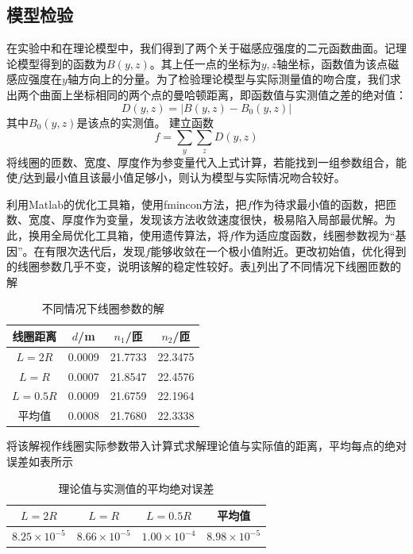 \documentclass{ctexart}
\begin{document}
\begin{multicols}{2}
\subsection{模型检验}
在实验中和在理论模型中，我们得到了两个关于磁感应强度的二元函数曲面。记理论模型得到的函数为$B(y,z)$。其上任一点的坐标为$y,z$轴坐标，函数值为该点磁感应强度在$y$轴方向上的分量。为了检验理论模型与实际测量值的吻合度，我们求出两个曲面上坐标相同的两个点的曼哈顿距离，即函数值与实测值之差的绝对值：
\begin{equation}
    D(y,z)=|B(y,z)-B_0(y,z)|
\end{equation}
其中$B_0(y,z)$是该点的实测值。
建立函数
\begin{equation}
    f=\sum_{y} \sum_{z} D(y,z)
\end{equation}
将线圈的匝数、宽度、厚度作为参变量代入上式计算，若能找到一组参数组合，能使$f$达到最小值且该最小值足够小，则认为模型与实际情况吻合较好。

利用Matlab的优化工具箱，使用fmincon方法，把$f$作为待求最小值的函数，把匝数、宽度、厚度作为变量，发现该方法收敛速度很快，极易陷入局部最优解。为此，换用全局优化工具箱，使用遗传算法，将$f$作为适应度函数，线圈参数视为“基因”。在有限次迭代后，发现$f$能够收敛在一个极小值附近。更改初始值，优化得到的线圈参数几乎不变，说明该解的稳定性较好。表\ref{不同情况下线圈匝数的解}列出了不同情况下线圈匝数的解
\begin{table}[H]
    \centering
    \caption{不同情况下线圈参数的解}
    \begin{tabular}{cccc}
        \hline
        线圈距离 & $d$/m & $n_1$/匝 & $n_2$/匝\\ \hline
        $L=2R$ & 0.0009 & 21.7733 & 22.3475\\
        $L=R$ &0.0007  & 21.8547  & 22.4576\\
        $L=0.5R$ &0.0009 &21.6759 &22.1964\\
        平均值 & 0.0008&21.7680& 22.3338 \\ \hline
    \end{tabular}
    \label{不同情况下线圈匝数的解}   
\end{table}
将该解视作线圈实际参数带入计算式求解理论值与实际值的距离，平均每点的绝对误差如表所示
\begin{table}[H]
    \centering
    \caption{理论值与实测值的平均绝对误差}
    \begin{tabular}{cccc}
        \hline
        $L=2R$ & $L=R$ & $L=0.5R$ & 平均值\\ \hline
        $8.25\times 10^{-5}$ & $8.66\times 10^{-5}$ & $1.00\times 10^{-4}$ 
         & $8.98\times 10^{-5}$  \\ \hline
    \end{tabular}
    \label{每个场点处的平均百分误差}   
\end{table}


\end{multicols}
\end{document}
